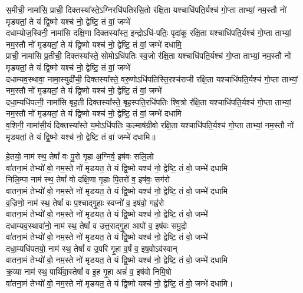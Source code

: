 स॒मीची॒ नामा॑सि॒ प्राची॒ दिक्तस्या᳚स्ते॒ऽग्निरधि॑\-पतिरसि॒तो र॑क्षि॒ता 
यश्चाधि॑पति॒र्यश्च॑ गो॒प्ता ताभ्यां॒ नम॒स्तौ नो॑ मृडयतां॒ ते 
यं द्वि॒ष्मो यश्च॑ नो॒ द्वेष्टि॒ तं वां॒ जम्भे॑\\
दधाम्योज॒स्विनी॒ नामा॑सि दक्षि॒णा दिक्तस्या᳚स्त॒ इन्द्रोऽधि॑-पतिः॒ पृदा॑कू रक्षि॒ता 
यश्चाधि॑पति॒र्यश्च॑ गो॒प्ता ताभ्यां॒ नम॒स्तौ नो॑ मृडयतां॒ ते 
यं द्वि॒ष्मो यश्च॑ नो॒ द्वेष्टि॒ तं वां॒ जम्भे॑ दधामि॒\\ 
प्राची॒ नामा॑सि प्र॒तीची॒ दिक्तस्या᳚स्ते॒ सोमोऽधि॑\-पतिः स्व॒जो र॑क्षि॒ता 
यश्चाधि॑पति॒र्यश्च॑ गो॒प्ता ताभ्यां॒ नम॒स्तौ नो॑ मृडयतां॒ ते 
यं द्वि॒ष्मो यश्च॑ नो॒ द्वेष्टि॒ तं वां॒ जम्भे॑\\
दधाम्यव॒स्थावा॒ नामा॒स्युदी॑ची॒ दिक्तस्या᳚स्ते॒ वरु॒णोऽधि॑\-पतिस्ति॒रश्च॑राजी रक्षि॒ता 
यश्चाधि॑पति॒र्यश्च॑ गो॒प्ता ताभ्यां॒ नम॒स्तौ नो॑ मृडयतां॒ ते 
यं द्वि॒ष्मो यश्च॑ नो॒ द्वेष्टि॒ तं वां॒ जम्भे॑\\
दधा॒म्यधि॑पत्नी॒ नामा॑सि बृह॒ती दिक्तस्या᳚स्ते॒ बृह॒स्पति॒रधि॑पतिः श्वि॒त्रो र॑क्षि॒ता 
यश्चाधि॑पति॒र्यश्च॑ गो॒प्ता ताभ्यां॒ नम॒स्तौ नो॑ मृडयतां॒ ते 
यं द्वि॒ष्मो यश्च॑ नो॒ द्वेष्टि॒ तं वां॒ जम्भे॑ दधामि\\
व॒शिनी॒ नामा॑सी॒यं दिक्तस्या᳚स्ते य॒मोऽधि॑पतिः क॒ल्माष॑ग्रीवो रक्षि॒ता 
यश्चाधि॑पति॒र्यश्च॑ गो॒प्ता ताभ्यां॒ नम॒स्तौ नो॑ मृडयतां॒ ते 
यं द्वि॒ष्मो यश्च॑ नो॒ द्वेष्टि॒ तं वां॒ जम्भे॑ दधामि॥

हे॒तयो॒ नाम॑ स्थ॒ तेषां᳚ वः पु॒रो गृ॒हा अ॒ग्निर्व॒ इष॑वः सलि॒लो\\ 
वा॑तना॒मं तेभ्यो॑ वो॒ नम॒स्ते नो॑ मृडयत॒ ते यं द्वि॒ष्मो यश्च॑ नो॒ द्वेष्टि॒ तं वो॒ जम्भे॑ दधामि\\
निलि॒म्पा नाम॑ स्थ॒ तेषां᳚ वो दक्षि॒णा गृ॒हाः पि॒तरो॑ व॒ इष॑वः॒ सग॑रो\\ 
वातना॒मं तेभ्यो॑ वो॒ नम॒स्ते नो॑ मृडयत॒ ते यं द्वि॒ष्मो यश्च॑ नो॒ द्वेष्टि॒ तं वो॒ जम्भे॑ दधामि\\
व॒ज्रिणो॒ नाम॑ स्थ॒ तेषां᳚ वः प॒श्चाद्गृ॒हाः स्वप्नो॑ व॒ इष॑वो॒ गह्व॑रो\\ 
वातना॒मं तेभ्यो॑ वो॒ नम॒स्ते नो॑ मृडयत॒ ते यं द्वि॒ष्मो यश्च॑ नो॒ द्वेष्टि॒ तं वो॒ जम्भे॑\\
दधाम्यव॒स्थावा॑नो॒ नाम॑ स्थ॒ तेषां᳚ व उत्त॒राद्गृ॒हा आपो॑ व॒ इष॑वः समु॒द्रो\\ 
वा॑तना॒मं तेभ्यो॑ वो॒ नम॒स्ते नो॑ मृडयत॒ ते यं द्वि॒ष्मो यश्च॑ नो॒ द्वेष्टि॒ तं वो॒ जम्भे॑\\
दधा॒म्यधि॑पतयो॒ नाम॑ स्थ॒ तेषां᳚ व उ॒परि॑ गृ॒हा व॒र्\mbox{}षं व॒ इष॒वोऽव॑स्वान्\\ 
वातना॒मं तेभ्यो॑ वो॒ नम॒स्ते नो॑ मृडयत॒ ते यं द्वि॒ष्मो यश्च॑ नो॒ द्वेष्टि॒ तं वो॒ जम्भे॑ दधामि\\
क्र॒व्या नाम॑ स्थ॒ पार्थि॑वा॒स्तेषां᳚ व इ॒ह गृ॒हा अन्नं॑ व॒ इष॑वो निमि॒षो\\ 
वा॑तना॒मं तेभ्यो॑ वो॒ नम॒स्ते नो॑ मृडयत॒ ते यं द्वि॒ष्मो यश्च॑ नो॒ द्वेष्टि॒ तं वो॒ जम्भे॑ दधामि।

